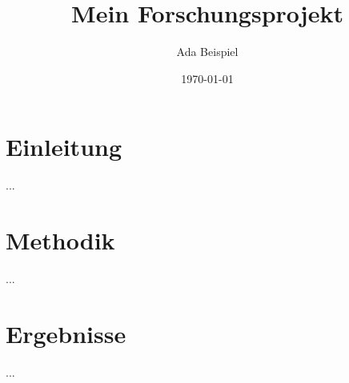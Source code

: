 \documentclass[a4paper,11pt]{article}
\title{Mein Forschungsprojekt}
\author{Ada Beispiel}
\date{\today}
\begin{document}
\maketitle
\tableofcontents
\newpage

\section{Einleitung}
...

\section{Methodik}
...

\section{Ergebnisse}
...
\end{document}
